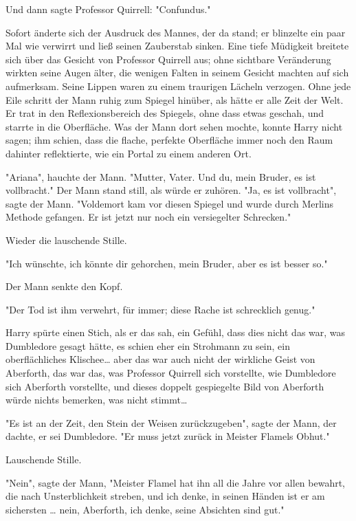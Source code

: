 {Und dann sagte Professor Quirrell: "Confundus."

Sofort änderte sich der Ausdruck des Mannes, der da stand; er blinzelte ein paar Mal wie verwirrt und ließ seinen Zauberstab sinken. Eine tiefe Müdigkeit breitete sich über das Gesicht von Professor Quirrell aus; ohne sichtbare Veränderung wirkten seine Augen älter, die wenigen Falten in seinem Gesicht machten auf sich aufmerksam. Seine Lippen waren zu einem traurigen Lächeln verzogen. Ohne jede Eile schritt der Mann ruhig zum Spiegel hinüber, als hätte er alle Zeit der Welt. Er trat in den Reflexionsbereich des Spiegels, ohne dass etwas geschah, und starrte in die Oberfläche. Was der Mann dort sehen mochte, konnte Harry nicht sagen; ihm schien, dass die flache, perfekte Oberfläche immer noch den Raum dahinter reflektierte, wie ein Portal zu einem anderen Ort.

"Ariana", hauchte der Mann. "Mutter, Vater. Und du, mein Bruder, es ist vollbracht." Der Mann stand still, als würde er zuhören. "Ja, es ist vollbracht", sagte der Mann. "Voldemort kam vor diesen Spiegel und wurde durch Merlins Methode gefangen. Er ist jetzt nur noch ein versiegelter Schrecken."

Wieder die lauschende Stille.

"Ich wünschte, ich könnte dir gehorchen, mein Bruder, aber es ist besser so."

Der Mann senkte den Kopf.

"Der Tod ist ihm verwehrt, für immer; diese Rache ist schrecklich genug."

Harry spürte einen Stich, als er das sah, ein Gefühl, dass dies nicht das war, was Dumbledore gesagt hätte, es schien eher ein Strohmann zu sein, ein oberflächliches Klischee… aber das war auch nicht der wirkliche Geist von Aberforth, das war das, was Professor Quirrell sich vorstellte, wie Dumbledore sich Aberforth vorstellte, und dieses doppelt gespiegelte Bild von Aberforth würde nichts bemerken, was nicht stimmt…

"Es ist an der Zeit, den Stein der Weisen zurückzugeben", sagte der Mann, der dachte, er sei Dumbledore. "Er muss jetzt zurück in Meister Flamels Obhut."

Lauschende Stille.

"Nein", sagte der Mann, "Meister Flamel hat ihn all die Jahre vor allen bewahrt, die nach Unsterblichkeit streben, und ich denke, in seinen Händen ist er am sichersten … nein, Aberforth, ich denke, seine Absichten sind gut."

}
